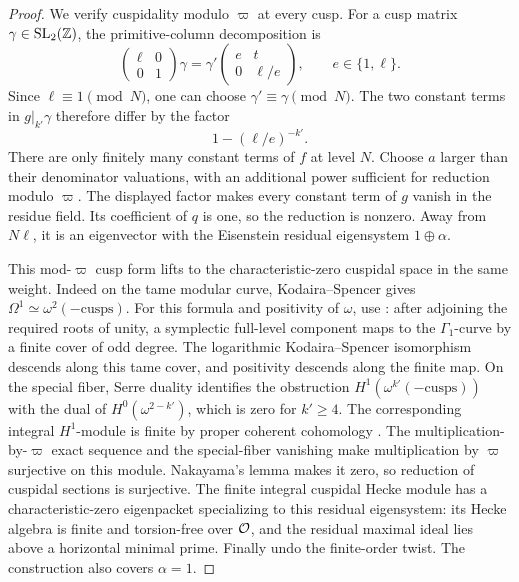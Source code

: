 \begin{proof}
We verify cuspidality modulo \(\varpi\) at every
cusp. For a cusp matrix \(\gamma\in\operatorname{SL}_2(\mathbb Z)\),
the primitive-column decomposition is
\[
 \begin{pmatrix}\ell&0\\0&1\end{pmatrix}\gamma
   =\gamma'
     \begin{pmatrix}e&t\\0&\ell/e\end{pmatrix},
 \qquad e\in\{1,\ell\}.
\]
Since \(\ell\equiv1\pmod N\), one can choose
\(\gamma'\equiv\gamma\pmod N\).
The two constant terms in \(g|_{k'}\gamma\)
therefore differ by the factor
\[
 1-(\ell/e)^{-k'}.
\]
There are only finitely many constant terms of
\(f\) at level \(N\). Choose \(a\) larger than
their denominator valuations, with an additional
power sufficient for reduction modulo
\(\varpi\). The displayed factor makes every
constant term of \(g\) vanish in the residue
field. Its coefficient of \(q\) is one, so the
reduction is nonzero. Away from \(N\ell\), it
is an eigenvector with the Eisenstein residual
eigensystem \(1\oplus\alpha\).

This mod-\(\varpi\) cusp form lifts to the
characteristic-zero cuspidal space in the same
weight. Indeed on the tame modular curve,
Kodaira--Spencer gives
\(\Omega^1\simeq\omega^2(-\mathrm{cusps})\).
For this formula and positivity of \(\omega\), use
\cite[Section~1.5 and Appendix~A1.5.4]{Katz1973}:
after adjoining the required roots of unity, a symplectic
full-level component maps to the \(\Gamma_1\)-curve
by a finite cover of odd degree. The logarithmic
Kodaira--Spencer isomorphism descends along this tame
cover, and positivity descends along the finite map.
On the special fiber, Serre duality
\cite[Lemma~53.4.1 and Remark~53.4.3, Tags~0BS2 and~0BS4]{StacksProject}
identifies the obstruction
\(H^1(\omega^{k'}(-\mathrm{cusps}))\) with
the dual of \(H^0(\omega^{2-k'})\), which is
zero for \(k'\ge4\). The corresponding integral \(H^1\)-module
is finite by proper coherent cohomology
\cite[Lemma~30.19.2, Tag~02O6]{StacksProject}.
The multiplication-by-\(\varpi\) exact sequence and the special-fiber
vanishing make multiplication by \(\varpi\) surjective on this module.
Nakayama's lemma makes it zero, so reduction of cuspidal sections is
surjective.
The finite integral cuspidal Hecke module has
a characteristic-zero eigenpacket specializing
to this residual eigensystem: its Hecke algebra
is finite and torsion-free over \(\mathcal O\), and
the residual maximal ideal lies above a
horizontal minimal prime. Finally undo the
finite-order twist. The construction also
covers \(\alpha=1\).
\end{proof}

